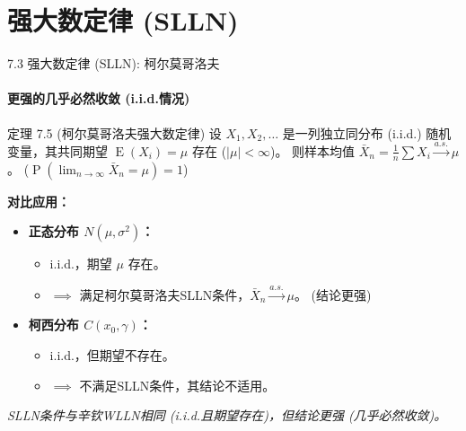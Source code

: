 \documentclass[UTF8]{beamer}
\DeclareMathOperator{\E}{\operatorname{E}}
\DeclareMathOperator{\Prob}{\operatorname{P}}
\begin{document}
\section{强大数定律 (SLLN)}
\begin{frame}[shrink=10]{7.3 强大数定律 (SLLN): 柯尔莫哥洛夫}
    \framesubtitle{更强的几乎必然收敛 (i.i.d.情况)}
    \begin{block}{定理 7.5 (柯尔莫哥洛夫强大数定律)}
        设 $X_1, X_2, \dots$ 是一列\alert{独立同分布 (i.i.d.)} 随机变量，其共同期望 $\E(X_i) = \mu$ \alert{存在} ($|\mu| < \infty$)。
        则样本均值 $\bar{X}_n = \frac{1}{n} \sum X_i \xrightarrow{a.s.} \mu$。
        ($\Prob(\lim_{n \to \infty} \bar{X}_n = \mu) = 1$)
    \end{block}
    \pause
    \textbf{对比应用：}
    \begin{itemize}
        \item \textbf{正态分布 $N(\mu, \sigma^2)$：}
            \begin{itemize}
                \item i.i.d.，期望 $\mu$ \alert{存在}。
                \item $\implies$ 满足柯尔莫哥洛夫SLLN条件，$\bar{X}_n \xrightarrow{a.s.} \mu$。 (结论更强)
            \end{itemize}
        \item \textbf{柯西分布 $C(x_0, \gamma)$：}
            \begin{itemize}
                \item i.i.d.，但期望\alert{不存在}。
                \item $\implies$ \alert{不满足}SLLN条件，其结论不适用。
            \end{itemize}
    \end{itemize}
    \footnotesize
    \textit{SLLN条件与辛钦WLLN相同 (i.i.d.且期望存在)，但结论更强 (几乎必然收敛)。}
\end{frame}
\end{document}
